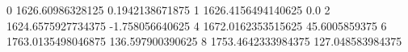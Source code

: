 0 1626.60986328125 0.1942138671875
1 1626.4156494140625 0.0
2 1624.6575927734375 -1.758056640625
4 1672.0162353515625 45.6005859375
6 1763.0135498046875 136.597900390625
8 1753.4642333984375 127.048583984375
